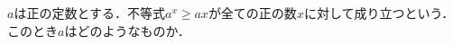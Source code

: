 \documentclass[../../main.tex]{subfiles}
\begin{document}
$a$は正の定数とする．不等式$a^x\ge ax$が全ての正の数$x$に対して成り立つという．
このとき$a$はどのようなものか．
\end{document}
